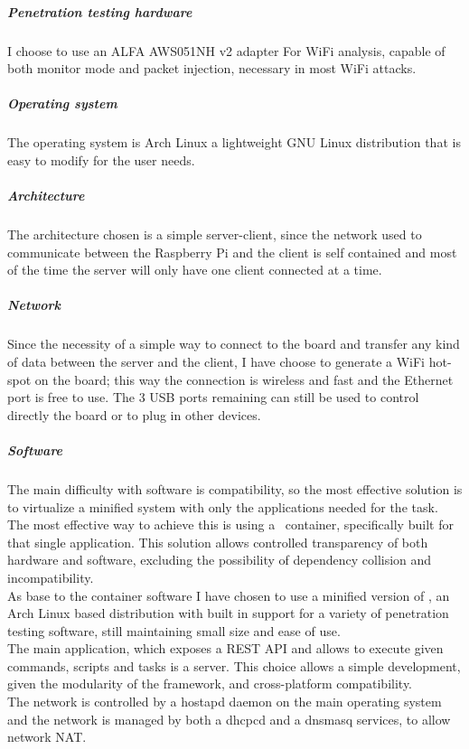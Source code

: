 \documentclass[../PiTest.tex]{subfiles}
\begin{document}
        \subparagraph{Penetration testing hardware}
            I choose to use an ALFA AWS051NH v2 adapter For WiFi analysis, capable of both monitor mode and packet injection, necessary in most WiFi attacks.

        \subparagraph{Operating system}
            The operating system is Arch Linux a lightweight GNU Linux distribution that is easy to modify for the user needs.

        \subparagraph{Architecture}
            The architecture chosen is a simple server-client, since the network used to communicate between the Raspberry Pi and the client is self contained and most of the time the server will only have one client connected at a time.

        \subparagraph{Network}
            Since the necessity of a simple way to connect to the board and transfer any kind of data between the server and the client, I have choose to generate a WiFi hot-spot on the board; this way the connection is wireless and fast and the Ethernet port is free to use. The 3 USB ports remaining can still be used to control directly the board or to plug in other devices.

        \subparagraph{Software}
            The main difficulty with software is compatibility, so the most effective solution is to virtualize a minified system with only the applications needed for the task. The most effective way to achieve this is using a \docker\  container, specifically built for that single application. This solution allows controlled transparency of both hardware and software, excluding the possibility of dependency collision and incompatibility.\\
            As base to the container software I have chosen to use a minified version of \blackarch, an Arch Linux based distribution with built in support for a variety of penetration testing software, still maintaining small size and ease of use. \\
            The main application, which exposes a REST API and allows to execute given commands, scripts and tasks is a \nodejs server. This choice allows a simple development, given the modularity of the framework, and cross-platform compatibility.\\
            The network is controlled by a hostapd daemon on the main operating system and the network is managed by both a dhcpcd and a dnsmasq services, to allow network NAT.


			
\end{document}
